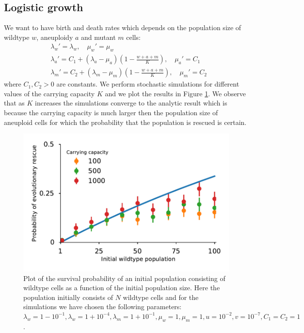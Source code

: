 \documentclass[12pt]{extarticle}
\begin{document}
\subsection*{Logistic growth}
We want to have birth and death rates which depends on the population size of wildtype $w$, aneuploidy $a$ and mutant $m$ cells:
\begin{align*}
&\lambda_w'=\lambda_w,\quad\mu_w'=\mu_w\\
&\lambda_a'=C_1+\left(\lambda_a-\mu_a\right)\left(1-\frac{w+a+m}{K}\right),\quad \mu_a'=C_1\\
&\lambda_m'=C_2+\left(\lambda_m-\mu_m\right)\left(1-\frac{w+a+m}{K}\right),\quad \mu_m'=C_2
\end{align*}
where $C_1, C_2>0$ are constants. We perform stochastic simulations for different values of the carrying capacity $K$ and we plot the results in Figure \ref{SurvPlotNDataLogisticKComplete}.  We observe that as $K$ increases the simulations converge to the analytic result which is because the carrying capacity is much larger then the population size of aneuploid cells for which the probability that the population is rescued is certain.

\begin{figure}[!t]
 \vspace*{1\baselineskip}
\includegraphics[width=1\textwidth]{Figures/SurvPlotNDataLogisticKComplete.pdf}
\caption{Plot of the survival probability of an initial population consisting of wildtype cells as a function of the initial population size.  Here the population initially consists of $N$ wildtype cells and for the simulations we have chosen the following parameters: $\lambda_w=1-10^{-1},\lambda_w=1+10^{-4},\lambda_m=1+10^{-1},\mu_w=1,\mu_m=1,u=10^{-2},v=10^{-7}, C_1=C_2=1$.}
\label{SurvPlotNDataLogisticKComplete}
\end{figure}
\end{document}
